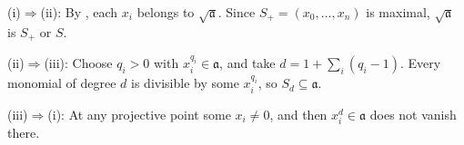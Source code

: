 (i)$\Rightarrow$(ii): By , each $x_i$ belongs to $\sqrt{\mathfrak a}$. Since $S_+=(x_0,\ldots,x_n)$ is maximal, $\sqrt{\mathfrak a}$ is $S_+$ or $S$.

(ii)$\Rightarrow$(iii): Choose $q_i>0$ with $x_i^{q_i}\in\mathfrak a$, and take $d=1+\sum_i(q_i-1)$. Every monomial of degree $d$ is divisible by some $x_i^{q_i}$, so $S_d\subseteq\mathfrak a$.

(iii)$\Rightarrow$(i): At any projective point some $x_i\ne0$, and then $x_i^d\in\mathfrak a$ does not vanish there.
